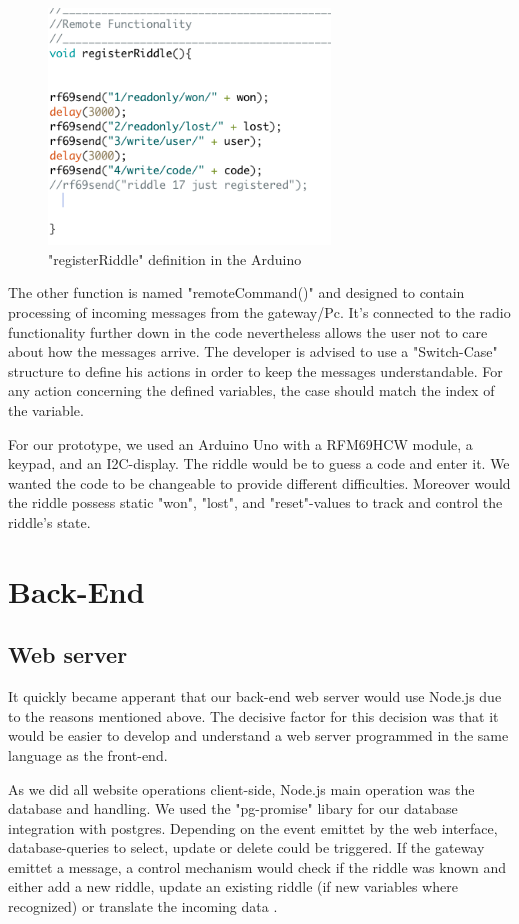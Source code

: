 \begin{figure}[th]
	\centering
	\includegraphics[width=75mm,scale=0.75]{Figures/registerRiddle}
	\decoRule
	\caption[FrontViewTable]{"registerRiddle" definition in the Arduino}
	\label{fig:FrontViewTable}
\end{figure}


The other function is named "remoteCommand()" and designed to contain processing of incoming messages from the gateway/Pc.
It's connected to the radio functionality further down in the code nevertheless allows the user not to care about how the messages arrive.
The developer is advised to use a "Switch-Case" structure to define his actions in order to keep the messages understandable. 
For any action concerning the defined variables, the case should match the index of the variable.

For our prototype, we used an Arduino Uno with a RFM69HCW module, a keypad, and an I2C-display. 
The riddle would be to guess a code and enter it. 
We wanted the code to be changeable to provide different difficulties. 
Moreover would the riddle possess static  "won", "lost", and "reset"-values to track and control the riddle's state.

\section{Back-End}

\subsection{Web server}
It quickly became apperant that our back-end web server would use Node.js due to the reasons mentioned above.
The decisive factor for this decision was that it would be easier to develop and understand a web server programmed in the same language as the front-end.

As we did all website operations client-side, Node.js main operation was the database and handling. 
We used the "pg-promise" libary \parencite{pg-promise} for our database integration with postgres. 
Depending on the event emittet by the web interface, database-queries to select, update or delete could be triggered.
If the gateway emittet a message, a control mechanism would check if the riddle was known and either add a new riddle, update an existing riddle (if new variables where recognized) or translate the incoming data .

